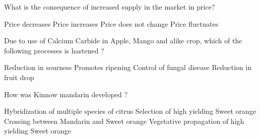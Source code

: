 \begin{questions}
\question What is the consequence of increased supply in the market in price?
\begin{choices}
\CorrectChoice Price decreases
\choice Price increases
\choice Price does not change
\choice Price fluctuates
\end{choices}

\question Due to use of Calcium Carbide in Apple, Mango and alike crop, which of the following processes is hastened ?
\begin{choices}
\choice Reduction in sourness
\CorrectChoice Promotes ripening
\choice Control of fungal disease
\choice Reduction in fruit drop
\end{choices}

\question How was Kinnow mandarin developed ?
\begin{choices}
\choice Hybridization of multiple species of citrus
\choice Selection of high yielding Sweet orange
\CorrectChoice Crossing between Mandarin and Sweet orange
\choice Vegetative propagation of high yielding Sweet orange
\end{choices}

\end{questions}
